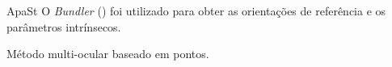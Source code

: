 \begin{frame}{ApaSt}
  O {\em Bundler} (\cite{Snavely2006}) foi utilizado para obter as orientações
  de referência e os parâmetros intrínsecos.

  Método multi-ocular baseado em pontos.

  \begin{center}
  \end{center}
\end{frame}



